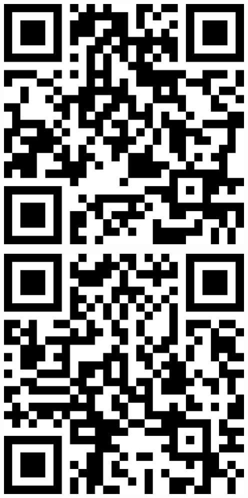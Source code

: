\documentclass[letterpaper]{article}
\begin{document}
 \endgroup 
 \vspace*{\fill} 
 \pagebreak 
{} 
 \vspace*{\fill} 
 \begingroup 
 \centerline{\includegraphics[scale=1,width=5in,height=5in]{Office3535.png}} 
 \endgroup 
 \vspace*{\fill} 
 \pagebreak 
{} 
 \vspace*{\fill} 
 \begingroup 
 \centerline{\includegraphics[scale=1,width=5in,height=5in]{Office3537.png}} 
\end{document}
